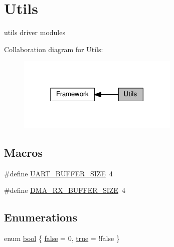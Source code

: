 \hypertarget{group___utils}{}\section{Utils}
\label{group___utils}


utils driver modules  


Collaboration diagram for Utils\+:\nopagebreak
\begin{figure}[H]
\begin{center}
\leavevmode
\includegraphics[width=218pt]{d6/dae/group___utils}
\end{center}
\end{figure}
\subsection*{Macros}
\begin{DoxyCompactItemize}
\item 
\#define \hyperlink{group___utils_ga0d57378e32bf8278011460740bc29f7f}{U\+A\+R\+T\+\_\+\+B\+U\+F\+F\+E\+R\+\_\+\+S\+I\+ZE}~4
\item 
\#define \hyperlink{group___utils_ga2345ec0af8fc8a1782768a22a15a4ad3}{D\+M\+A\+\_\+\+R\+X\+\_\+\+B\+U\+F\+F\+E\+R\+\_\+\+S\+I\+ZE}~4
\end{DoxyCompactItemize}
\subsection*{Enumerations}
\begin{DoxyCompactItemize}
\item 
enum \hyperlink{group___utils_gaf6a258d8f3ee5206d682d799316314b1}{bool} \{ \hyperlink{group___utils_ggaf6a258d8f3ee5206d682d799316314b1ae9de385ef6fe9bf3360d1038396b884c}{false} = 0, 
\hyperlink{group___utils_ggaf6a258d8f3ee5206d682d799316314b1a08f175a5505a10b9ed657defeb050e4b}{true} = !false
 \}
\end{DoxyCompactItemize}
